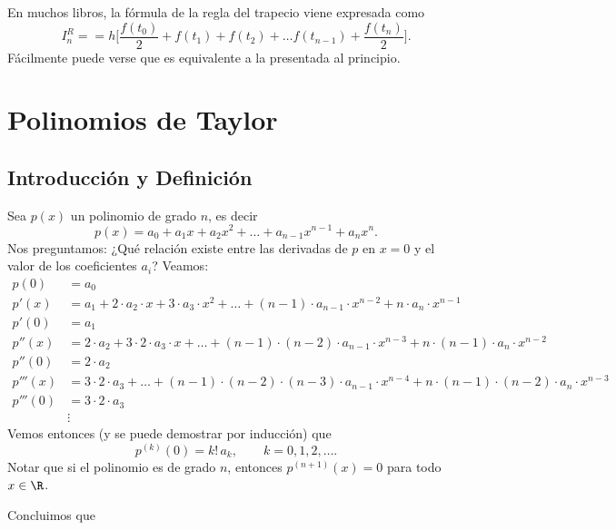\begin{obs}
 En muchos libros, la fórmula de la regla del trapecio viene expresada como
\[
 I_n^R = = h \Big[ \frac{f(t_0)}{2} + f(t_1) + f(t_2) + \dots f(t_{n-1}) + \frac{f(t_n)}2 \Big].
\]
Fácilmente puede verse que es equivalente a la presentada al principio.
\end{obs}

\section{Polinomios de Taylor}

\subsection{Introducción y Definición}

Sea $p(x)$ un polinomio de grado $n$, es decir
\[
 p(x) = a_0 + a_1 x + a_2 x^2 + \dots + a_{n-1} x^{n-1} + a_n x^n.
\]
Nos preguntamos: ¿Qué relación existe entre las derivadas de $p$ en $x = 0$ y el valor de los coeficientes $a_i$?
Veamos:
\begin{align*}
 p(0)   &= a_0 \\
 p'(x)  &= a_1 + 2 \cdot a_2 \cdot x + 3 \cdot a_3 \cdot x^2 + \dots + (n-1) \cdot a_{n-1} \cdot x^{n-2} + n \cdot a_n \cdot x^{n-1} \\
 p'(0)  &= a_1 \\
 p''(x) &= 2 \cdot a_2 + 3 \cdot 2 \cdot a_3 \cdot x + \dots + (n-1) \cdot (n-2) \cdot a_{n-1} \cdot x^{n-3} + n \cdot (n-1) \cdot a_n \cdot x^{n-2} \\
 p''(0) &= 2 \cdot a_2 \\
 p'''(x) &= 3\cdot 2 \cdot a_3 + \dots + (n-1) \cdot (n-2) \cdot (n-3) \cdot a_{n-1} \cdot x^{n-4} + n \cdot (n-1) \cdot (n-2) \cdot a_n \cdot x^{n-3} \\
 p'''(0) &= 3 \cdot 2 \cdot a_3 \\
&\vdots
\end{align*}
Vemos entonces (y se puede demostrar por inducción) que
\[
 p^{(k)} (0) = k! \, a_k,\qquad k=0,1,2,\dots.
\]
Notar que si el polinomio es de grado $n$, entonces $p^{(n+1)}(x) = 0$ para todo $x \in \R$.

Concluimos que


